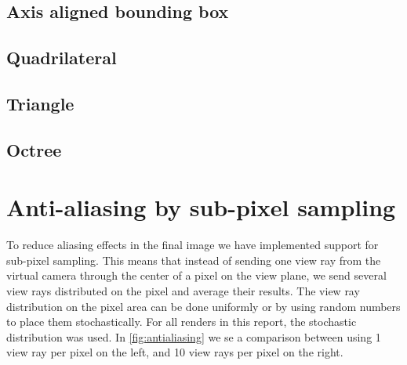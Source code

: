 \documentclass[]{report}   %
\begin{document}
\subsection{Axis aligned bounding box}


\subsection{Quadrilateral}
\subsection{Triangle}
\subsection{Octree}

\section{Anti-aliasing by sub-pixel sampling}
To reduce aliasing effects in the final image we have implemented support for sub-pixel sampling. This means that instead of sending one view ray from the virtual camera through the center of a pixel on the view plane, we send several view rays distributed on the pixel and average their results. The view ray distribution on the pixel area can be done uniformly or by using random numbers to place them stochastically. For all renders in this report, the stochastic distribution was used. In  \autoref{fig:antialiasing} we se a comparison between using 1 view ray per pixel on the left, and 10 view rays per pixel on the right.
\end{document}
